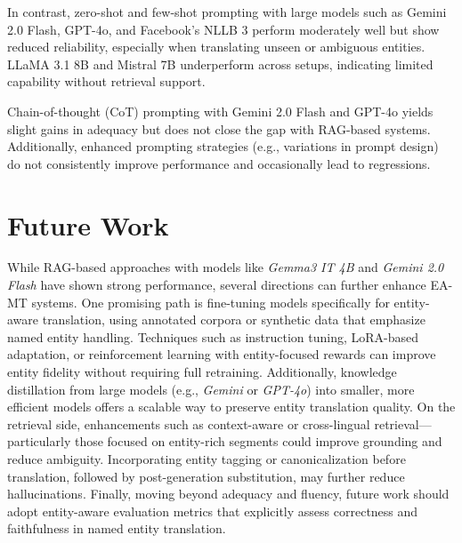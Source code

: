 \documentclass{ecai}
\begin{document}
In contrast, zero-shot and few-shot prompting with large models such as Gemini 2.0 Flash, GPT-4o, 
and Facebook's NLLB 3 perform moderately well but show reduced reliability, especially when translating unseen or 
ambiguous entities. LLaMA 3.1 8B and Mistral 7B underperform across setups, indicating limited capability without retrieval 
support.

Chain-of-thought (CoT) prompting with Gemini 2.0 Flash and GPT-4o yields slight gains in adequacy but does not 
close the gap with RAG-based systems. Additionally, enhanced prompting strategies (e.g., variations in prompt design) 
do not consistently improve performance and occasionally lead to regressions.

\section{Future Work}
\label{sec:future_work}
While RAG-based approaches with models like \textit{Gemma3 IT 4B} and \textit{Gemini 2.0 Flash} have shown strong performance, 
several directions can further enhance EA-MT systems. One promising path is fine-tuning models specifically for 
entity-aware translation, using annotated corpora or synthetic data that emphasize named entity handling. 
Techniques such as instruction tuning, LoRA-based adaptation, or reinforcement learning with entity-focused rewards 
can improve entity fidelity without requiring full retraining. 
Additionally, knowledge distillation from large models (e.g., \textit{Gemini} or \textit{GPT-4o}) into smaller, 
more efficient models offers a scalable way to preserve entity translation quality. On the retrieval side,
enhancements such as context-aware or cross-lingual retrieval—particularly those focused on entity-rich segments 
could improve grounding and reduce ambiguity. Incorporating entity tagging or canonicalization before translation, 
followed by post-generation substitution, may further reduce hallucinations. 
Finally, moving beyond adequacy and fluency, future work should adopt entity-aware evaluation metrics that explicitly 
assess correctness and faithfulness in named entity translation.
    

\end{document}
